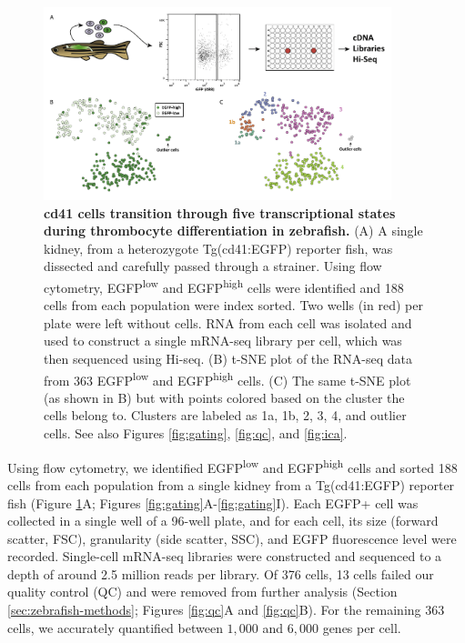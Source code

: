 \begin{figure}
    \centering
    \includegraphics[width=0.9\textwidth]{"Figure1"}
    \caption[cd41 cells transition through five transcriptional states during thrombocyte differentiation in zebrafish]{\textbf{cd41 cells transition through five transcriptional states during thrombocyte differentiation in zebrafish.} (A) A single kidney, from a heterozygote Tg(cd41:EGFP) reporter fish, was dissected and carefully passed through a strainer. Using flow cytometry, EGFP\textsuperscript{low} and EGFP\textsuperscript{high} cells were identified and 188 cells from each population were index sorted. Two wells (in red) per plate were left without cells. RNA from each cell was isolated and used to construct a single mRNA-seq library per cell, which was then sequenced using Hi-seq. (B)	t-SNE plot of the RNA-seq data from 363 EGFP\textsuperscript{low} and EGFP\textsuperscript{high} cells. (C)	The same t-SNE plot (as shown in B) but with points colored based on the cluster the cells belong to. Clusters are labeled as 1a, 1b, 2, 3, 4, and outlier cells. See also Figures \ref{fig:gating}, \ref{fig:qc}, and \ref{fig:ica}.}
    \label{fig:sorting}
\end{figure}

\begin{sloppypar}
Using flow cytometry, we identified EGFP\textsuperscript{low} and EGFP\textsuperscript{high} cells and sorted 188 cells from each population from a single kidney from a Tg(cd41:EGFP) reporter fish (Figure \ref{fig:sorting}A; Figures \ref{fig:gating}A-\ref{fig:gating}I). Each EGFP+ cell was collected in a single well of a 96-well plate, and for each cell, its size (forward scatter, FSC), granularity (side scatter, SSC), and EGFP fluorescence level were recorded. Single-cell mRNA-seq libraries were constructed and sequenced to a depth of around 2.5 million reads per library. Of 376 cells, 13 cells failed our quality control (QC) and were removed from further analysis (Section \ref{sec:zebrafish-methods}; Figures \ref{fig:qc}A and \ref{fig:qc}B). For the remaining 363 cells, we accurately quantified between \( 1,000 \) and \( 6,000 \) genes per cell.
\end{sloppypar}

